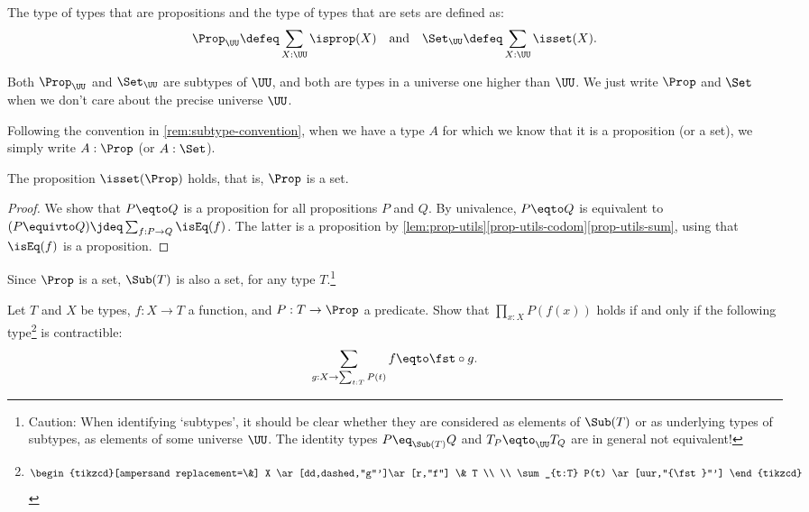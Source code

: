 \begin{example}\label{def:Prop-Set}
The type of types that are propositions and the
type of types that are sets are defined as:
\[\Prop_\UU\defeq \sum_{X:\UU}\isprop(X)\quad
\text{and}\quad\Set_\UU\defeq \sum_{X:\UU}\isset(X).\]

Both $\Prop_\UU$ and $\Set_\UU$ are subtypes of $\UU$, and
both are types in a universe one higher than $\UU$.
We just write $\Prop$ and $\Set$ when we don't care about the 
precise universe $\UU$.

Following the convention in \cref{rem:subtype-convention},
when we have a type $A$ for which we know that it is a proposition (or a set),
we simply write $A : \Prop$ (or $A : \Set$).
\end{example}

\begin{lemma}\label{lem:Prop-in-Set}
The proposition $\isset(\Prop)$ holds, that is, $\Prop$ is a set.
\end{lemma}
\begin{proof}
We show that $P\eqto Q$ is a proposition for all propositions $P$ and $Q$.
By univalence, $P\eqto Q$ is equivalent to 
$(P\equivto Q)\jdeq\sum_{f:P\to Q}\isEq(f)$.
The latter is a proposition by \cref{lem:prop-utils}\ref{prop-utils-codom}\ref{prop-utils-sum}, using that $\isEq(f)$ is a proposition.
\end{proof}

Since $\Prop$ is a set, $\Sub(T)$ is also a set, for any type $T$.\footnote{%
\label{ft:caution-subtype}
Caution: When identifying `subtypes', it
should be clear whether they are considered as elements of $\Sub(T)$ or
as underlying types of subtypes, \ie as elements of some universe $\UU$.
The identity types $P\eq_{\Sub(T)} Q$ and $T_P\eqto_{\UU} T_Q$ are in general
not equivalent!}

\begin{xca}\label{xca:subtype-univ-prop}
  Let $T$ and $X$ be types, $f: X\to T$ a function,
  and $P : T\to\Prop$ a predicate. Show that $\prod_{x:X} P(f(x))$
  holds if and only if the following type\footnote{\label{ft:subtype-univ-prop}%
    \[
      \begin{tikzcd}[ampersand replacement=\&]
        X \ar[dd,dashed,"g"']\ar[r,"f"] \& T \\
        \\
        \sum_{t:T} P(t) \ar[uur,"{\fst}"']
      \end{tikzcd}
    \]}
  is contractible:
   \begin{displaymath}
    \sum_{g: X \to \sum_{t:T} P(t)} f \eqto \fst\circ g.\qedhere
  \end{displaymath}
\end{xca}

